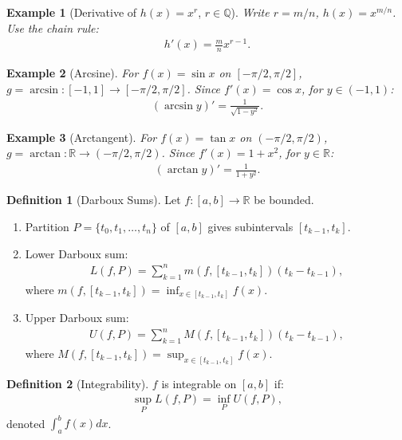 \documentclass[7pt]{article}
\theoremstyle{definition}
\newtheorem{definition}{Definition}
\theoremstyle{plain}
\newtheorem{example}{Example}
\begin{document}
\begin{example}[Derivative of $ h(x) = x^r $, $ r \in \mathbb{Q} $]
Write $ r = m/n $, $ h(x) = x^{m/n} $. Use the chain rule:
\begin{align}
h'(x) = \frac{m}{n} x^{r-1}.
\end{align}
\end{example}

\begin{example}[Arcsine]
For $ f(x) = \sin x $ on $ [-\pi/2, \pi/2] $, $ g = \arcsin : [-1, 1] \to [-\pi/2, \pi/2] $. Since $ f'(x) = \cos x $, for $ y \in (-1, 1) $:
\begin{align}
(\arcsin y)' = \frac{1}{\sqrt{1-y^2}}.
\end{align}
\end{example}

\begin{example}[Arctangent]
For $ f(x) = \tan x $ on $ (-\pi/2, \pi/2) $, $ g = \arctan : \mathbb{R} \to (-\pi/2, \pi/2) $. Since $ f'(x) = 1 + x^2 $, for $ y \in \mathbb{R} $:
\begin{align}
(\arctan y)' = \frac{1}{1 + y^2}.
\end{align}
\end{example}

\begin{definition}[Darboux Sums]
Let $ f : [a, b] \to \mathbb{R} $ be bounded.
\begin{enumerate}
    \item Partition $ P = \{t_0, t_1, \ldots, t_n\} $ of $ [a, b] $ gives subintervals $ [t_{k-1}, t_k] $.
    \item Lower Darboux sum:
    \begin{align}
    L(f, P) = \sum_{k=1}^n m(f, [t_{k-1}, t_k])(t_k - t_{k-1}),
    \end{align}
    where $ m(f, [t_{k-1}, t_k]) = \inf_{x \in [t_{k-1}, t_k]} f(x) $.
    \item Upper Darboux sum:
    \begin{align}
    U(f, P) = \sum_{k=1}^n M(f, [t_{k-1}, t_k])(t_k - t_{k-1}),
    \end{align}
    where $ M(f, [t_{k-1}, t_k]) = \sup_{x \in [t_{k-1}, t_k]} f(x) $.
\end{enumerate}
\end{definition}

\begin{definition}[Integrability]
$ f $ is integrable on $ [a, b] $ if:
\begin{align}
\sup_P L(f, P) = \inf_P U(f, P),
\end{align}
denoted $ \int_a^b f(x) dx $.
\end{definition}
\end{document}
